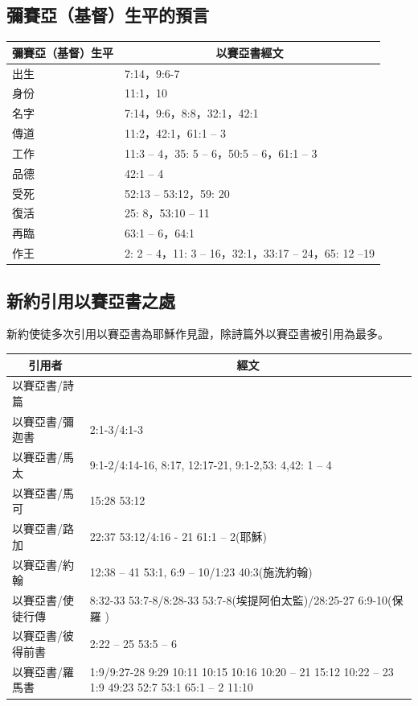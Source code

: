 \subsection{彌賽亞（基督）生平的預言}
\begin{table}[H]
\centering
\begin{tabular}{p{1.5cm}|p{}}\hline\hline
\multicolumn{1}{c|}{彌賽亞（基督）生平}&\multicolumn{1}{c}{以賽亞書經文}\\\hline
出生&7:14，9:6-7\\\hline
身份&11:1，10\\\hline
名字&7:14，9:6，8:8，32:1，42:1\\\hline
傳道&11:2，42:1，61:1 – 3\\\hline
工作&11:3 – 4，35: 5 – 6，50:5 – 6，61:1 – 3\\\hline
品德&42:1 – 4\\\hline
受死&52:13 – 53:12，59: 20\\\hline
復活& 25: 8，53:10 – 11\\\hline
再臨& 63:1 – 6，64:1\\\hline
作王& 2: 2 – 4，11: 3 – 16，32:1，33:17 – 24，65: 12 –19\\\hline
\end{tabular}
\end{table}

\subsection{新約引用以賽亞書之處}
新約使徒多次引用以賽亞書為耶穌作見證，除詩篇外以賽亞書被引用為最多。
\begin{table}[H]
\centering
\begin{tabular}{p{3.5cm}|p{}}\hline\hline
\multicolumn{1}{c|}{引用者}&\multicolumn{1}{c}{經文}\\\hline
以賽亞書/詩篇&\\\hline
以賽亞書/彌迦書&2:1-3/4:1-3 \\\hline
以賽亞書/馬太&9:1-2/4:14-16, 8:17, 12:17-21, 9:1-2,53: 4,42: 1 – 4\\\hline
以賽亞書/馬可&15:28 53:12\\\hline
以賽亞書/路加&22:37 53:12/4:16 - 21 61:1 – 2(耶穌)\\\hline
以賽亞書/約翰&12:38 – 41 53:1, 6:9 – 10/1:23 40:3(施洗約翰)\\\hline
以賽亞書/使徒行傳&8:32-33 53:7-8/8:28-33 53:7-8(埃提阿伯太監)/28:25-27 6:9-10(保羅 )\\\hline
以賽亞書/彼得前書&2:22 – 25 53:5 – 6\\\hline
以賽亞書/羅馬書&1:9/9:27-28  9:29 10:11 10:15 10:16 10:20 – 21 15:12 10:22 – 23 1:9 49:23 52:7 53:1 65:1 – 2 11:10 \\\hline
\end{tabular}
\end{table}


